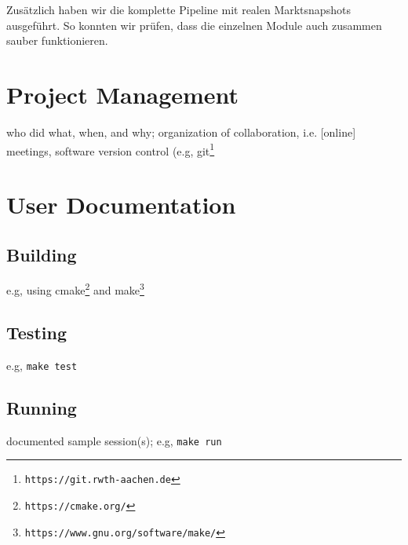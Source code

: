 \documentclass{book}
\begin{document}
Zusätzlich haben wir die komplette Pipeline mit realen Marktsnapshots ausgeführt. So konnten wir prüfen, dass die einzelnen Module auch zusammen sauber funktionieren.

\chapter{Project Management} \label{ch:projectmanagement}

who did what, when, and why; organization of collaboration, i.e. [online] meetings, software version control (e.g, git\footnote{\tt https://git.rwth-aachen.de}




\appendix

\chapter{User Documentation} \label{ch:userdoc}

\section{Building}

e.g, using cmake\footnote{\tt https://cmake.org/} and make\footnote{\tt https://www.gnu.org/software/make/}


\section{Testing}

e.g, \verb!make test!

\section{Running}

documented sample session(s); e.g, \verb!make run!
\end{document}
